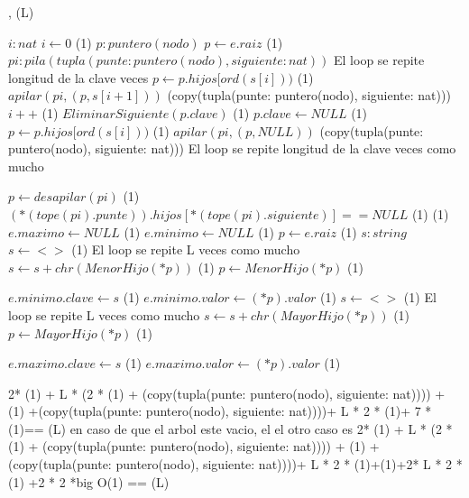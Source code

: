 {   ,
    }
    {}
    {\bigo(L)}
{
	\var $i : nat$
	\State $ i \gets 0$  												\comment \bigo(1) 
	\var $p : puntero(nodo)$ 
	\State $ p \gets e.raiz$											\comment \bigo(1)  
	\var $pi: pila(tupla(punte: puntero(nodo), siguiente: nat))$ 
     	\Statex             \comment El loop se repite longitud de la clave veces
     	\State $p \gets p.hijos[ord(s[i]))$								\comment \bigo(1)
     	\State $apilar(pi, (p,s[i+1])) $								\comment \bigo(copy(tupla(punte: puntero(nodo), siguiente: nat))) 
     	\State $i++$   													\comment \bigo(1) 
    \EndWhile	
    \State $EliminarSiguiente(p.clave)$            \comment \bigo(1)
    \State $p.clave \gets NULL$               \comment \bigo(1)
    \State $p \gets p.hijos[ord(s[i]))$								\comment \bigo(1)
     \State $apilar(pi, (p,NULL)) $							\comment \bigo(copy(tupla(punte: puntero(nodo), siguiente: nat)))	
     	\Statex             \comment El loop se repite longitud de la clave veces como mucho
 
     	\State $p \gets desapilar(pi)$								\comment \bigo(1)
     	  \State $(*(tope(pi).punte)).hijos[*(tope(pi).siguiente)] == NULL$							\comment \bigo(1)	
    \EndWhile	
                         			\comment \bigo(1)
		 	\State $e.maximo \gets NULL$							\comment \bigo(1)
	\State $e.minimo \gets NULL$							\comment \bigo(1)
	\Else
         \State $ p \gets e.raiz$	\comment \bigo(1)
         \var $s : string$ 
         \State $ s \gets <>$	\comment \bigo(1)
     		\Statex             \comment El loop se repite L veces como mucho
     		\State $s \gets s+chr(MenorHijo(*p))$								\comment \bigo(1)	
     		\State $p \gets MenorHijo(*p)$								\comment \bigo(1)	
     				
    	\EndWhile		
    	\State $e.minimo.clave \gets s$								\comment \bigo(1)	
    	\State $e.minimo.valor \gets (*p).valor$								\comment \bigo(1)	
    	\State $ s \gets <>$	\comment \bigo(1)
     		\Statex             \comment El loop se repite L veces como mucho
     		\State $s \gets s+chr(MayorHijo(*p))$								\comment \bigo(1)	
     		\State $p \gets MayorHijo(*p)$								\comment \bigo(1)	
     				
    	\EndWhile		
    	\State $e.maximo.clave \gets s$								\comment \bigo(1)	
    	\State $e.maximo.valor \gets (*p).valor$								\comment \bigo(1)	
    	
     \EndIf
												 

}	{  2* \bigo(1) + L * (2 * \bigo(1) + \bigo(copy(tupla(punte: puntero(nodo), siguiente: nat)))) + \bigo(1) +\bigo(copy(tupla(punte: puntero(nodo), siguiente: nat))))+ L * 2 * \bigo(1)+ 7 * \bigo(1)== \bigo(L) en caso de que el arbol este vacio, el el otro caso es 
2* \bigo(1) + L * (2 * \bigo(1) + \bigo(copy(tupla(punte: puntero(nodo), siguiente: nat)))) + \bigo(1) +\bigo(copy(tupla(punte: puntero(nodo), siguiente: nat))))+ L * 2 * \bigo(1)+\bigo(1)+2* L * 2 * \bigo(1) +2 * 2 *big O(1) == \bigo(L)}

